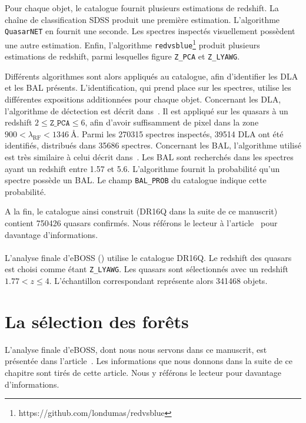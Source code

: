 \documentclass[11pt, twoside, a4paper, openright]{report}
\begin{document}
Pour chaque objet, le catalogue fournit plusieurs estimations de redshift. La chaîne de classification SDSS produit une première estimation. L'algorithme \texttt{QuasarNET} en fournit une seconde. Les spectres inspectés visuellement possèdent une autre estimation. Enfin, l'algorithme \texttt{redvsblue}\footnote{https://github.com/londumas/redvsblue} produit plusieurs estimations de redshift, parmi lesquelles figure \texttt{Z\_PCA} et \texttt{Z\_LYAWG}.

Différents algorithmes sont alors appliqués au catalogue, afin d'identifier les DLA et les BAL présents. L'identification, qui prend place sur les spectres, utilise les différentes expositions additionnées pour chaque objet.
Concernant les DLA, l'algorithme de déctection est décrit dans~\cite{Parks2017}. Il est appliqué sur les quasars à un redshift $2 \leq \texttt{Z\_PCA} \leq 6$, afin d'avoir suffisamment de pixel dans la zone $900 < \lambda_{\mathrm{RF}} < \SI{1346}{\angstrom}$. Parmi les \num{270315} spectres inspectés, \num{39514} DLA ont été identifiés, distribués dans \num{35686} spectres.
Concernant les BAL, l'algorithme utilisé est très similaire à celui décrit dans~\cite{Guo2019}. Les BAL sont recherchés dans les spectres ayant un redshift entre \num{1.57} et \num{5.6}. L'algorithme fournit la probabilité qu'un spectre possède un BAL. Le champ \texttt{BAL\_PROB} du catalogue indique cette probabilité.

A la fin, le catalogue ainsi construit (DR16Q dans la suite de ce manuscrit) contient \num{750426} quasars confirmés. Nous référons le lecteur à l'article~\cite{CITE:Lyke in prep} pour davantage d'informations.



\paragraph{}
L'analyse \lya{} finale d'eBOSS (\cite{CITE:dr16}) utilise le catalogue DR16Q. Le redshift des quasars est choisi comme étant \texttt{Z\_LYAWG}. Les quasars sont sélectionnés avec un redshift $1.77 < z \leq 4$. L'échantillon correspondant représente alors \num{341468} objets.


\section{La sélection des forêts}
L'analyse \lya{} finale d'eBOSS, dont nous nous servons dans ce manuscrit, est présentée dans l'article~\cite{CITE:dr16}. Les informations que nous donnons dans la suite de ce chapitre sont tirés de cette article. Nous y référons le lecteur pour davantage d'informations.
\end{document}
